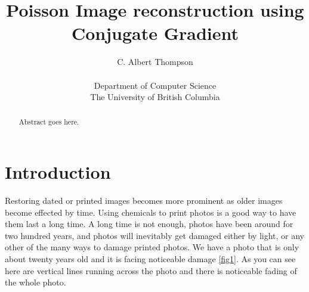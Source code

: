 \documentclass[10pt,twopage]{acmsiggraph}
\begin{document}
%
%

\title{Poisson Image reconstruction using Conjugate Gradient}

\newcommand\name{C. Albert Thompson}

\author{\name\\
\\
Department of Computer Science\\
The University of British Columbia}

\maketitle

%
%

\begin{abstract}
  Abstract goes here.
\end{abstract}

%
%

\section{Introduction}
\label{Intro}

Restoring dated or printed images becomes more prominent as older images become effected by time. Using chemicals to print photos is a good way to have them last a long time. A long time is not enough, photos have been around for two hundred years, and photos will inevitably get damaged either by light, or any other of the many ways to damage printed photos. We have a photo that is only about twenty years old and it is facing noticeable damage \ref{fig1}. As you can see here are vertical lines running across the photo and there is noticeable fading of the whole photo. 
\end{document}
